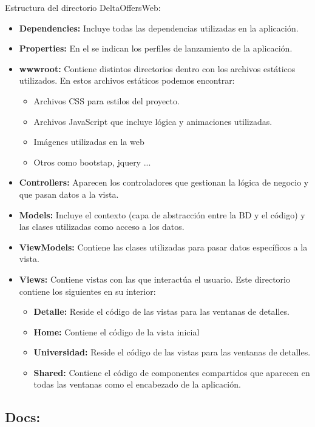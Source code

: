 Estructura del directorio DeltaOffersWeb:
\begin{itemize}
    \item \textbf{Dependencies:} Incluye todas las dependencias utilizadas en la aplicación.
    \item \textbf{Properties:} En el se indican los perfiles de lanzamiento de la aplicación.
    \item \textbf{wwwroot:} Contiene distintos directorios dentro con los archivos estáticos utilizados. En estos archivos estáticos podemos encontrar:
    \begin{itemize}
        \item Archivos CSS para estilos del proyecto.
        \item Archivos JavaScript que incluye lógica y animaciones utilizadas.
        \item Imágenes utilizadas en la web
        \item Otros como bootstap, jquery ...
    \end{itemize}
    \item \textbf{Controllers:} Aparecen los controladores que gestionan la lógica de negocio y que pasan datos a la vista.
    \item \textbf{Models:} Incluye el contexto (capa de abstracción entre la BD y el código) y las clases utilizadas como acceso a los datos.
    \item \textbf{ViewModels:} Contiene las clases utilizadas para pasar datos específicos a la vista.
    \item \textbf{Views:} Contiene vistas con las que interactúa el usuario. Este directorio contiene los siguientes en su interior:
    \begin{itemize}
        \item \textbf{Detalle:} Reside el código de las vistas para las ventanas de detalles.
        \item \textbf{Home:} Contiene el código de la vista inicial
        \item \textbf{Universidad:} Reside el código de las vistas para las ventanas de detalles.
        \item \textbf{Shared:} Contiene el código de componentes compartidos que aparecen en todas las ventanas como el encabezado de la aplicación.
    \end{itemize}  
\end{itemize}

\subsection{Docs:}

